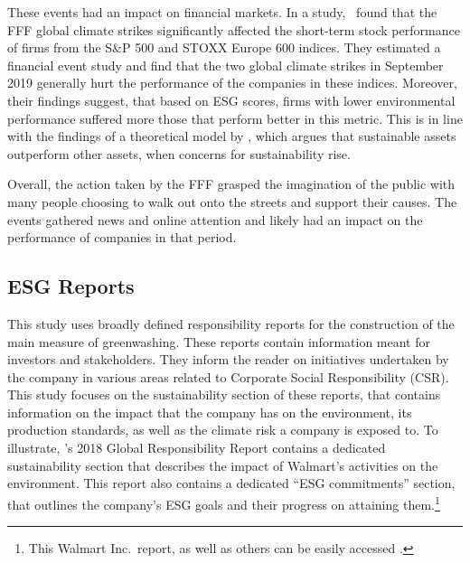 \documentclass[12pt]{article}
\begin{document}
These events had an impact on financial markets. In a \citeyear{schusterStockPriceReactions2023} study,~\citeauthor{schusterStockPriceReactions2023} found that the FFF global climate strikes significantly affected the short-term stock performance of firms from the S\&P 500 and STOXX Europe 600 indices. They estimated a financial event study and find that the two global climate strikes in September 2019 generally hurt the performance of the companies in these indices. Moreover, their findings suggest, that based on ESG scores, firms with lower environmental performance suffered more those that perform better in this metric.  This is in line with the findings of a theoretical model by \textcite{pastorSustainableInvestingEquilibrium2021}, which argues that sustainable assets outperform other assets, when concerns for sustainability rise.

Overall, the action taken by the FFF grasped the imagination of the public with many people choosing to walk out onto the streets and support their causes. The events gathered news and online attention and likely had an impact on the performance of companies in that period.


\subsection{ESG Reports}


This study uses broadly defined responsibility reports for the construction of the main measure of greenwashing. These reports contain information meant for investors and stakeholders. They inform the reader on initiatives undertaken by the company in various areas related to Corporate Social Responsibility (CSR). This study focuses on the sustainability section of these reports, that contains information on the impact that the company has on the environment, its production standards, as well as the climate risk a company is exposed to. To illustrate, \citeauthor{walmart2018csr}'s 2018 Global Responsibility Report contains a dedicated sustainability section that describes the impact of Walmart's activities on the environment. This report also contains a dedicated ``ESG commitments'' section, that outlines the company's ESG goals and their progress on attaining them.\footnote{This Walmart Inc.~report, as well as others can be easily accessed \href{https://www.responsibilityreports.com/Company/walmart-inc}{}.}
\end{document}
